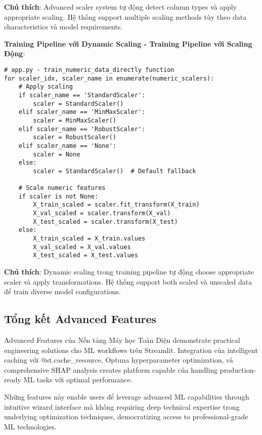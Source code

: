 \textbf{Chú thích}: Advanced scaler system tự động detect column types và apply appropriate scaling. Hệ thống support multiple scaling methods tùy theo data characteristics và model requirements.

\textbf{Training Pipeline với Dynamic Scaling - Training Pipeline với Scaling Động}:

\begin{verbatim}
# app.py - train_numeric_data_directly function
for scaler_idx, scaler_name in enumerate(numeric_scalers):
    # Apply scaling
    if scaler_name == 'StandardScaler':
        scaler = StandardScaler()
    elif scaler_name == 'MinMaxScaler':
        scaler = MinMaxScaler()
    elif scaler_name == 'RobustScaler':
        scaler = RobustScaler()
    elif scaler_name == 'None':
        scaler = None
    else:
        scaler = StandardScaler()  # Default fallback
    
    # Scale numeric features
    if scaler is not None:
        X_train_scaled = scaler.fit_transform(X_train)
        X_val_scaled = scaler.transform(X_val)
        X_test_scaled = scaler.transform(X_test)
    else:
        X_train_scaled = X_train.values
        X_val_scaled = X_val.values
        X_test_scaled = X_test.values
\end{verbatim}

\textbf{Chú thích}: Dynamic scaling trong training pipeline tự động choose appropriate scaler và apply transformations. Hệ thống support both scaled và unscaled data để train diverse model configurations.

\subsection{Tổng kết Advanced Features}

\noindent
Advanced Features của Nền tảng Máy học Toàn Diện demonstrate practical engineering solutions cho ML workflows trên Streamlit. Integration của intelligent caching với @st.cache\_resource, Optuna hyperparameter optimization, và comprehensive SHAP analysis creates platform capable của handling production-ready ML tasks với optimal performance.

Những features này enable users để leverage advanced ML capabilities through intuitive wizard interface mà không requiring deep technical expertise trong underlying optimization techniques, democratizing access to professional-grade ML technologies.